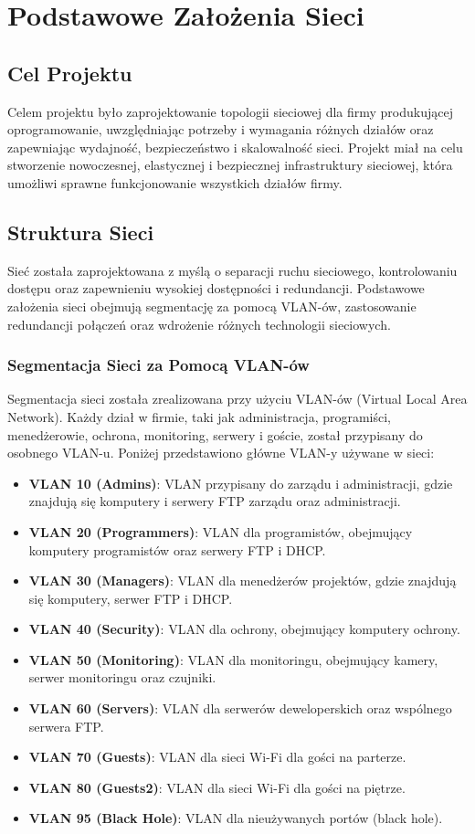 \setlength{\headheight}{14.49998pt}
\addtolength{\topmargin}{-2.49998pt}
\chapter{Podstawowe Założenia Sieci}
\section{Cel Projektu}
Celem projektu było zaprojektowanie topologii sieciowej dla firmy produkującej oprogramowanie, uwzględniając potrzeby i wymagania różnych działów oraz zapewniając wydajność, bezpieczeństwo i skalowalność sieci. Projekt miał na celu stworzenie nowoczesnej, elastycznej i bezpiecznej infrastruktury sieciowej, która umożliwi sprawne funkcjonowanie wszystkich działów firmy. 

\section{Struktura Sieci}
Sieć została zaprojektowana z myślą o separacji ruchu sieciowego, kontrolowaniu dostępu oraz zapewnieniu wysokiej dostępności i redundancji. Podstawowe założenia sieci obejmują segmentację za pomocą VLAN-ów, zastosowanie redundancji połączeń oraz wdrożenie różnych technologii sieciowych.

\subsection{Segmentacja Sieci za Pomocą VLAN-ów}
Segmentacja sieci została zrealizowana przy użyciu VLAN-ów (Virtual Local Area Network). Każdy dział w firmie, taki jak administracja, programiści, menedżerowie, ochrona, monitoring, serwery i goście, został przypisany do osobnego VLAN-u. Poniżej przedstawiono główne VLAN-y używane w sieci:
\begin{itemize}
    \item \textbf{VLAN 10 (Admins)}: VLAN przypisany do zarządu i administracji, gdzie znajdują się komputery i serwery FTP zarządu oraz administracji.
    \item \textbf{VLAN 20 (Programmers)}: VLAN dla programistów, obejmujący komputery programistów oraz serwery FTP i DHCP.
    \item \textbf{VLAN 30 (Managers)}: VLAN dla menedżerów projektów, gdzie znajdują się komputery, serwer FTP i DHCP.
    \item \textbf{VLAN 40 (Security)}: VLAN dla ochrony, obejmujący komputery ochrony.
    \item \textbf{VLAN 50 (Monitoring)}: VLAN dla monitoringu, obejmujący kamery, serwer monitoringu oraz czujniki.
    \item \textbf{VLAN 60 (Servers)}: VLAN dla serwerów deweloperskich oraz wspólnego serwera FTP.
    \item \textbf{VLAN 70 (Guests)}: VLAN dla sieci Wi-Fi dla gości na parterze.
    \item \textbf{VLAN 80 (Guests2)}: VLAN dla sieci Wi-Fi dla gości na piętrze.
    \item \textbf{VLAN 95 (Black Hole)}: VLAN dla nieużywanych portów (black hole).
\end{itemize}


